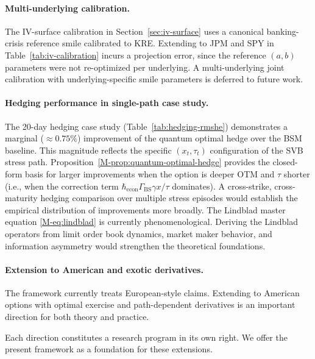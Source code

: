 \paragraph{Multi-underlying calibration.}
The IV-surface calibration in Section~\ref{sec:iv-surface} uses a canonical
banking-crisis reference smile calibrated to KRE. Extending to JPM and SPY in
Table~\ref{tab:iv-calibration} incurs a projection error, since the reference
$(a, b)$ parameters were not re-optimized per underlying. A multi-underlying
joint calibration with underlying-specific smile parameters is deferred to
future work.

\paragraph{Hedging performance in single-path case study.}
The 20-day hedging case study (Table~\ref{tab:hedging-rmshe}) demonstrates a
marginal ($\approx 0.75\%$) improvement of the quantum optimal hedge over the
BSM baseline. This magnitude reflects the specific $(x_t, \tau_t)$ configuration
of the SVB stress path. Proposition~\ref{M-prop:quantum-optimal-hedge} provides the
closed-form basis for larger improvements when the option is deeper OTM and
$\tau$ shorter (i.e., when the correction term
$\hbar_{\mathrm{econ}} \Gamma_{\text{BS}} \gamma x/\tau$ dominates). A
cross-strike, cross-maturity hedging comparison over multiple stress episodes
would establish the empirical distribution of improvements more broadly.
The Lindblad master equation \eqref{M-eq:lindblad} is currently phenomenological.
Deriving the Lindblad operators from limit order book dynamics, market maker
behavior, and information asymmetry would strengthen the theoretical
foundations.

\paragraph{Extension to American and exotic derivatives.}
The framework currently treats European-style claims. Extending to American
options with optimal exercise and path-dependent derivatives is an important
direction for both theory and practice.

Each direction constitutes a research program in its own right. We offer the
present framework as a foundation for these extensions.

